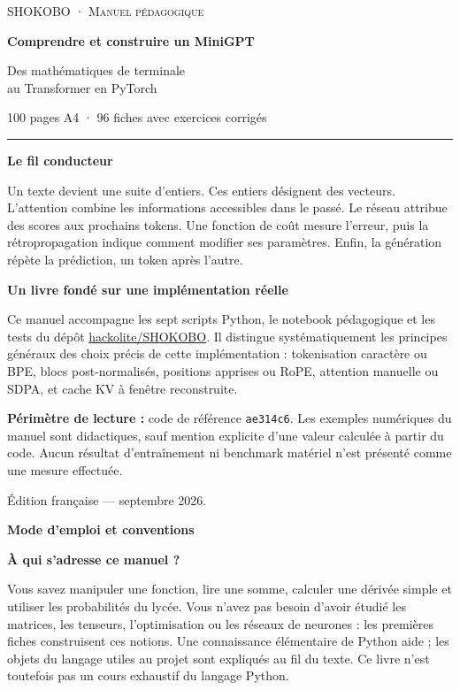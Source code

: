 \documentclass[a4paper,11pt]{article}
\newcommand{\code}[1]{\texttt{#1}}
\begin{document}
\thispagestyle{empty}
\vspace*{14mm}
{\large\scshape SHOKOBO · Manuel pédagogique\par}
\vspace{13mm}
{\Huge\bfseries Comprendre et construire un MiniGPT\par}
\vspace{9mm}
{\LARGE Des mathématiques de terminale\\au Transformer en PyTorch\par}
\vspace{13mm}
{\large 100 pages A4 · 96 fiches avec exercices corrigés\par}
\vspace{12mm}
\hrule
\vspace{7mm}
\textbf{Le fil conducteur}

Un texte devient une suite d'entiers. Ces entiers désignent des vecteurs.
L'attention combine les informations accessibles dans le passé.
Le réseau attribue des scores aux prochains tokens. Une fonction de coût mesure
l'erreur, puis la rétropropagation indique comment modifier ses paramètres.
Enfin, la génération répète la prédiction, un token après l'autre.

\vspace{5mm}
\textbf{Un livre fondé sur une implémentation réelle}

Ce manuel accompagne les sept scripts Python, le notebook pédagogique et les
tests du dépôt \href{https://github.com/hackolite/SHOKOBO}{hackolite/SHOKOBO}.
Il distingue systématiquement les principes généraux des choix précis de cette
implémentation : tokenisation caractère ou BPE, blocs post-normalisés, positions
apprises ou RoPE, attention manuelle ou SDPA, et cache KV à fenêtre reconstruite.

\vfill
\textbf{Périmètre de lecture :} code de référence \code{ae314c6}.
Les exemples numériques du manuel sont didactiques, sauf mention explicite
d'une valeur calculée à partir du code. Aucun résultat d'entraînement ni
benchmark matériel n'est présenté comme une mesure effectuée.

\medskip
Édition française — septembre 2026.

\clearpage
{\LARGE\bfseries Mode d'emploi et conventions\par}
\vspace{4mm}
\textbf{À qui s'adresse ce manuel ?}

Vous savez manipuler une fonction, lire une somme, calculer une dérivée simple
et utiliser les probabilités du lycée. Vous n'avez pas besoin d'avoir étudié
les matrices, les tenseurs, l'optimisation ou les réseaux de neurones :
les premières fiches construisent ces notions. Une connaissance élémentaire de
Python aide ; les objets du langage utiles au projet sont expliqués au fil du
texte. Ce livre n'est toutefois pas un cours exhaustif du langage Python.
\end{document}
